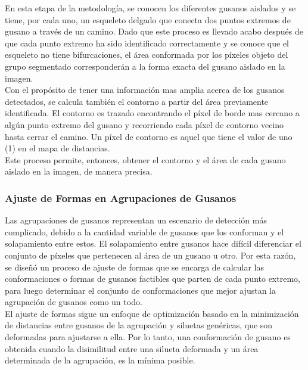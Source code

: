 En esta etapa de la metodolog\'ia, se conocen los diferentes gusanos aislados
y se tiene, por cada uno, un esqueleto delgado que conecta dos puntos
extremos de gusano a trav\'es de un camino.
Dado que este proceso es llevado acabo despu\'es de que cada punto extremo
ha sido identificado correctamente y se conoce que el esqueleto no tiene
bifurcaciones, el \'area conformada por los p\'ixeles objeto del grupo
segmentado corresponder\'an a la forma exacta del gusano aislado en la
imagen.\\

Con el prop\'osito de tener una informaci\'on mas amplia acerca de los gusanos
detectados, se calcula tambi\'en el contorno a partir del \'area previamente identificada.
El contorno es trazado encontrando el p\'ixel de borde mas cercano a alg\'un punto extremo
del gusano y recorriendo cada p\'ixel de contorno vecino hasta cerrar el camino. 
Un p\'ixel de contorno es aquel que tiene el valor de uno (1) en el mapa de distancias.\\

Este proceso permite, entonces, obtener el contorno y el \'area de cada
gusano aislado en la imagen, de manera precisa.

\subsubsection{Ajuste de Formas en Agrupaciones de Gusanos}
\label{sec:clusterfit}

Las agrupaciones de gusanos representan un escenario de detecci\'on m\'as complicado, 
debido a la cantidad variable de gusanos que los conforman y el solapamiento entre estos.
El solapamiento entre gusanos hace dif\'icil diferenciar el conjunto de p\'ixeles que pertenecen
al \'area de un gusano u otro. Por esta raz\'on, se dise\~n\'o un proceso de ajuste de formas
que se encarga de calcular las conformaciones o formas de gusanos factibles que parten
de cada punto extremo, para luego determinar el conjunto de conformaciones que mejor
ajustan la agrupaci\'on de gusanos como un todo.\\

El ajuste de formas sigue un enfoque de optimizaci\'on basado en la minimizaci\'on
de distancias entre gusanos de la agrupaci\'on y siluetas gen\'ericas, que son deformadas
para ajustarse a ella. Por lo tanto, una conformaci\'on de gusano es obtenida cuando
la disimilitud entre una silueta deformada y un \'area determinada de la agrupaci\'on, 
es la m\'inima posible.\\

